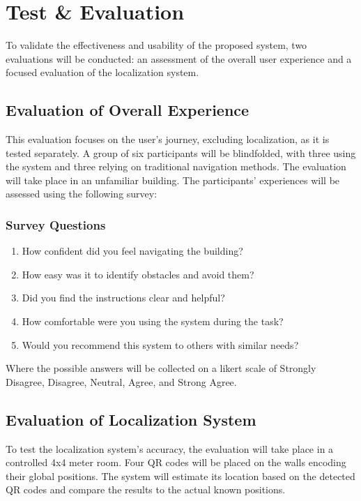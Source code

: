 \section{Test \& Evaluation}

To validate the effectiveness and usability of the proposed system, two evaluations will be conducted: an assessment of the overall user experience and a focused evaluation of the localization system.

\subsection{Evaluation of Overall Experience}

This evaluation focuses on the user's journey, excluding localization, as it is tested separately. A group of six participants will be blindfolded, with three using the system and three relying on traditional navigation methods. The evaluation will take place in an unfamiliar building. The participants’ experiences will be assessed using the following survey:

\subsubsection*{Survey Questions}
\begin{enumerate}
	\item How confident did you feel navigating the building?
	\item How easy was it to identify obstacles and avoid them?
	\item Did you find the instructions clear and helpful?
	\item How comfortable were you using the system during the task?
	\item Would you recommend this system to others with similar needs?
\end{enumerate}

Where the possible answers will be collected on a likert scale of Strongly Disagree, Disagree, Neutral, Agree, and Strong Agree. 


\subsection{Evaluation of Localization System}

To test the localization system's accuracy, the evaluation will take place in a controlled 4x4 meter room. Four QR codes will be placed on the walls encoding their global positions. The system will estimate its location based on the detected QR codes and compare the results to the actual known positions.

